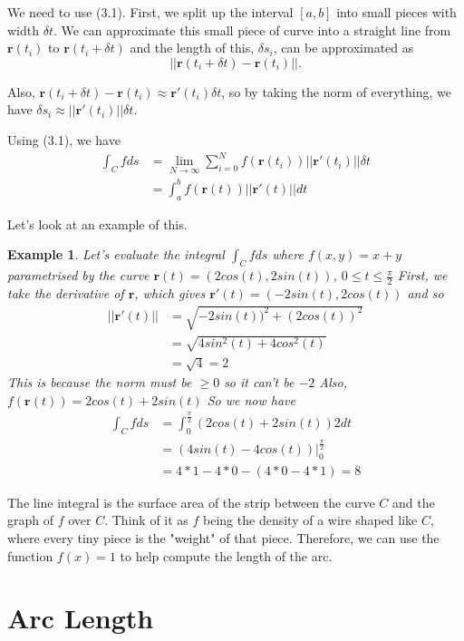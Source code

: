 \documentclass[12pt]{book}
\makeatletter
\theoremstyle{definitionstyle}
\newtheorem{example}[definition]{Example}
\renewenvironment{proof}[1][\proofname]{\par
  \pushQED{\qed}%
  \normalfont \topsep6\p@\@plus6\p@\relax
  \trivlist
  \item[\hskip\labelsep
		\bfseries
	#1\@addpunct{.}]\ignorespaces
}{
  \popQED\endtrivlist\@endpefalse
}
\numberwithin{equation}{section}
\makeatother
\begin{document}
\begin{proof}
    We need to use (3.1). First, we split up the interval $[a, b]$ into small pieces with width $\delta t$. We can approximate this small piece of curve into a straight line from $\mathbf{r}(t_i)$ to $\mathbf{r}(t_i + \delta t)$ and the length of this, $\delta s_i$, can be approximated as $$||\mathbf{r}(t_i+\delta t) - \mathbf{r}(t_i)||.$$

    Also, $\mathbf{r}(t_i + \delta t) - \mathbf{r}(t_i) \approx \mathbf{r}'(t_i) \delta t$, so by taking the norm of everything, we have $\delta s_i \approx ||\mathbf{r}'(t_i)||\delta t.$

    Using (3.1), we have
\begin{equation}
    \begin{split}
        \int_C f ds &= \lim_{N \to \infty} \sum_{i = 0}^N f(\mathbf{r}(t_i)) ||\mathbf{r}'(t_i)|| \delta t \\ &=\int_{a}^{b} f(\mathbf{r}(t))||\mathbf{r}'(t)||dt
    \end{split}
\end{equation}
\end{proof}

Let's look at an example of this.

\begin{example}
Let's evaluate the integral $\int_C f ds$ where $f(x,y) = x + y$ parametrised by the curve $\mathbf{r}(t) = (2cos(t), 2sin(t))$, $0 \leq t \leq \frac{\pi}{2}$
First, we take the derivative of $\mathbf{r}$, which gives $\mathbf{r}'(t) = (-2sin(t), 2cos(t))$ and so
\begin{equation}
	\begin{split}
		||\mathbf{r}'(t)|| &= \sqrt{-2sin(t))^2 + (2cos(t))^2} \\&= \sqrt{4sin^2(t) + 4cos^2(t)} \\&= \sqrt{4} = 2
	\end{split}
\end{equation}
This is because the norm must be $\geq 0$ so it can't be $-2$
Also, $f(\mathbf{r}(t)) = 2cos(t) + 2sin(t)$
So we now have
\begin{equation}
	\begin{split}
		\int_C f ds &= \int_{0}^{\frac{\pi}{2}} (2cos(t) + 2sin(t))2dt \\&= (4sin(t) - 4cos(t))|_{0}^{\frac{\pi}{2}} \\&= 4*1 - 4*0 - (4*0 - 4*1) = 8
	\end{split}
\end{equation}
\end{example}

The line integral is the surface area of the strip between the curve $C$ and the graph of $f$ over $C$. Think of it as $f$ being the density of a wire shaped like $C$, where every tiny piece is the "weight" of that piece. Therefore, we can use the function $f(x) = 1$ to help compute the length of the arc.

\section{Arc Length}
\end{document}
